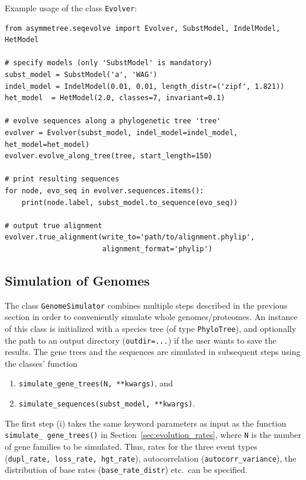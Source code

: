 \documentclass[hidelinks,11pt]{article}
\begin{document}
Example usage of the class \texttt{Evolver}:

\begin{adjustwidth}{1cm}{1cm}\vspace{2mm}
\begin{verbatim}
from asymmetree.seqevolve import Evolver, SubstModel, IndelModel, HetModel

# specify models (only 'SubstModel' is mandatory)
subst_model = SubstModel('a', 'WAG')
indel_model = IndelModel(0.01, 0.01, length_distr=('zipf', 1.821))
het_model  = HetModel(2.0, classes=7, invariant=0.1)

# evolve sequences along a phylogenetic tree 'tree'
evolver = Evolver(subst_model, indel_model=indel_model, het_model=het_model)
evolver.evolve_along_tree(tree, start_length=150)

# print resulting sequences
for node, evo_seq in evolver.sequences.items():
    print(node.label, subst_model.to_sequence(evo_seq))

# output true alignment
evolver.true_alignment(write_to='path/to/alignment.phylip',
                       alignment_format='phylip')
\end{verbatim}
\end{adjustwidth}


\subsection{Simulation of Genomes}

The class \texttt{GenomeSimulator} combines multiple steps described in the previous section in order to conveniently simulate whole genomes/proteomes.
An instance of this class is initialized with a species tree (of type \texttt{PhyloTree}), and optionally the path to an output directory (\texttt{outdir=...}) if the user wants to save the results.
The gene trees and the sequences are simulated in subsequent steps using the classes' function
\begin{enumerate}[label=(\roman*)]
	\item \texttt{simulate\_gene\_trees(N, **kwargs)}, and
	\item \texttt{simulate\_sequences(subst\_model, **kwargs)}.
\end{enumerate}

\noindent
The first step (i) takes the same keyword parameters as input as the function \texttt{simulate\_ gene\_trees()} in Section~\ref{sec:evolution_rates}, where \texttt{N} is the number of gene families to be simulated.
Thus, rates for the three event types (\texttt{dupl\_rate, loss\_rate, hgt\_rate}), autocorrelation (\texttt{autocorr\_variance}), the distribution of base rates (\texttt{base\_rate\_distr}) etc.\ can be specified.
\end{document}
